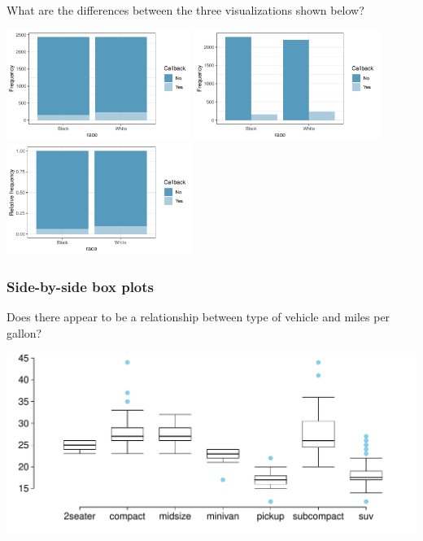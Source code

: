 \documentclass[notes,11pt, aspectratio=169]{beamer}
\newcommand{\dq}[1]{
\begin{beamerboxesrounded}[shadow = false, lower = disc ques body]{}
#1
\end{beamerboxesrounded}
}
\begin{document}
\begin{frame}

\dq{What are the differences between the three visualizations shown below?}

\begin{center}
\includegraphics[width=0.45\textwidth]{graphs/l02f15a}
\includegraphics[width=0.45\textwidth]{graphs/l02f15b} \\
\includegraphics[width=0.45\textwidth]{graphs/l02f15c}
\end{center}

\end{frame}


\begin{frame}
\frametitle{Side-by-side box plots}

\dq{Does there appear to be a relationship between type of vehicle and miles per gallon?}

\begin{center}
\includegraphics[width=\textwidth]{graphs/l02f16}
\end{center}
\end{frame}
\end{document}
